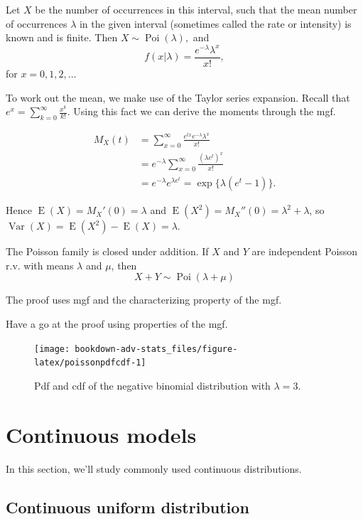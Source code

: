 \documentclass[
]{book}
\DeclareMathOperator{\E}{E}
\DeclareMathOperator{\Var}{Var}
\DeclareMathOperator{\Pois}{Poi}
\theoremstyle{definition}
\theoremstyle{definition}
\theoremstyle{definition}
\theoremstyle{definition}
\theoremstyle{remark}
\begin{document}
Let \(X\) be the number of occurrences in this interval, such that the mean number of occurrences \(\lambda\) in the given interval (sometimes called the rate or intensity) is known and is finite. Then \(X\sim\Pois(\lambda),\) and
\[
f(x|\lambda) = \frac{e^{-\lambda}\lambda^x}{x!},
\]
for \(x=0,1,2,\dots\)

To work out the mean, we make use of the Taylor series expansion.
Recall that \(e^x=\sum_{k=0}^\infty \frac{x^k}{k!}\).
Using this fact we can derive the moments through the mgf.

\begin{align*}
M_X(t)
&= \sum_{x=0}^\infty \frac{e^{tx} e^{-\lambda}\lambda^x}{x!} \\
&= e^{-\lambda} \sum_{x=0}^\infty \frac{(\lambda e^t)^x}{x!} \\
&= e^{-\lambda}e^{\lambda e^t} = \exp\{\lambda(e^t - 1) \}.
\end{align*}

Hence \(\E(X)=M_X'(0)=\lambda\) and \(\E(X^2)=M_X''(0)=\lambda^2+\lambda\), so \(\Var(X)=\E(X^2)-\E(X)=\lambda\).

The Poisson family is closed under addition.
If \(X\) and \(Y\) are independent Poisson r.v. with means \(\lambda\) and \(\mu\), then
\[
X+Y \sim \Pois(\lambda + \mu)
\]

The proof uses mgf and the characterizing property of the mgf.

Have a go at the proof using properties of the mgf.

\begin{figure}

{\centering \texttt{[image: bookdown-adv-stats\_files/figure-latex/poissonpdfcdf-1]} 

}

\caption{Pdf and cdf of the negative binomial distribution with \(\lambda=3\).}\label{fig:poissonpdfcdf}
\end{figure}

\hypertarget{continuous-models}{%
\section{Continuous models}\label{continuous-models}}

In this section, we'll study commonly used continuous distributions.

\hypertarget{continuous-uniform-distribution}{%
\subsection{Continuous uniform distribution}\label{continuous-uniform-distribution}}
\end{document}
